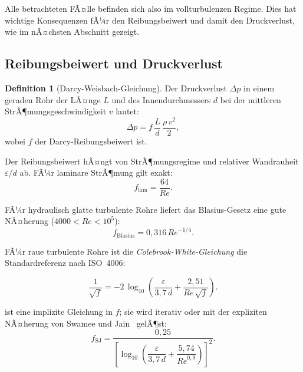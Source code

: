 ﻿\documentclass[12pt,a4paper,twoside]{article}
\theoremstyle{plain}
\theoremstyle{definition}
\newtheorem{definition}[theorem]{Definition}
\theoremstyle{remark}
\newcommand{\Rey}{\mathit{Re}}
\begin{document}
\noindent
Alle betrachteten FÃ¤lle befinden sich also im vollturbulenzen Regime.
Dies hat wichtige Konsequenzen fÃ¼r den Reibungsbeiwert und damit den
Druckverlust, wie im nÃ¤chsten Abschnitt gezeigt.

\subsection{Reibungsbeiwert und Druckverlust}
\label{ssec:druckverlust}

\begin{definition}[Darcy-Weisbach-Gleichung]
Der Druckverlust $\Delta p$ in einem geraden Rohr der LÃ¤nge $L$ und des
Innendurchmessers $d$ bei der mittleren StrÃ¶mungsgeschwindigkeit $v$ lautet:
\begin{equation}
  \Delta p = f \, \frac{L}{d} \, \frac{\rho \, v^2}{2},
  \label{eq:darcy_weisbach}
\end{equation}
wobei $f$ der Darcy-Reibungsbeiwert ist.
\end{definition}

Der Reibungsbeiwert hÃ¤ngt von StrÃ¶mungsregime und relativer Wandrauheit
$\varepsilon/d$ ab.
FÃ¼r laminare StrÃ¶mung gilt exakt:
\begin{equation}
  f_{\mathrm{lam}} = \frac{64}{\Rey}.
  \label{eq:f_laminar}
\end{equation}

FÃ¼r hydraulisch glatte turbulente Rohre liefert das Blasius-Gesetz
eine gute NÃ¤herung ($4000 < \Rey < 10^5$):
\begin{equation}
  f_{\mathrm{Blasius}} = 0{,}316 \, \Rey^{-1/4}.
  \label{eq:f_blasius}
\end{equation}

FÃ¼r raue turbulente Rohre ist die \emph{Colebrook-White-Gleichung} die
Standardreferenz nach ISO~4006:

\begin{equation}
  \frac{1}{\sqrt{f}} = -2\,\log_{10}\!\left(
      \frac{\varepsilon}{3{,}7\,d} + \frac{2{,}51}{\Rey\,\sqrt{f}}
  \right).
  \label{eq:colebrook}
\end{equation}

\noindent
{} ist eine implizite Gleichung in $f$; sie wird iterativ oder
mit der expliziten NÃ¤herung von Swamee und Jain~\cite{Swamee1976} gelÃ¶st:
\begin{equation}
  f_{\mathrm{SJ}} = \frac{0{,}25}{\left[
      \log_{10}\!\!\left(\dfrac{\varepsilon}{3{,}7\,d}
        + \dfrac{5{,}74}{\Rey^{0{,}9}}\right)
  \right]^2}.
  \label{eq:swamee_jain}
\end{equation}
\end{document}
